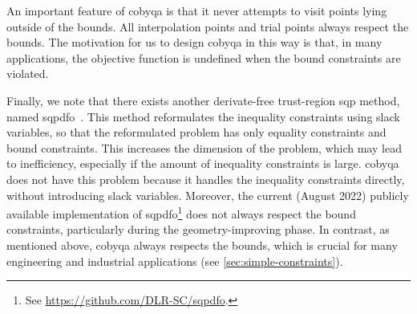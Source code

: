 An important feature of \gls{cobyqa} is that it never attempts to visit points lying outside of the bounds.
All interpolation points and trial points always respect the bounds.
The motivation for us to design \gls{cobyqa} in this way is that, in many applications, the objective function is undefined when the bound constraints are violated.

Finally, we note that there exists another derivate-free trust-region \gls{sqp} method, named \gls{sqpdfo}~\cite{Troltzsch_2016,Gratton_Toint_Troltzsch_2011,Troltzsch_Ilic_Siggel_2021}.
This method reformulates the inequality constraints using slack variables, so that the reformulated problem has only equality constraints and bound constraints.
This increases the dimension of the problem, which may lead to inefficiency, especially if the amount of inequality constraints is large.
\Gls{cobyqa} does not have this problem because it handles the inequality constraints directly, without introducing slack variables.
Moreover, the current (August 2022) publicly available implementation of \gls{sqpdfo}\footnote{See \url{https://github.com/DLR-SC/sqpdfo}.} does not always respect the bound constraints, particularly during the geometry-improving phase.
In contrast, as mentioned above, \gls{cobyqa} always respects the bounds, which is crucial for many engineering and industrial applications (see \cref{sec:simple-constraints}).
